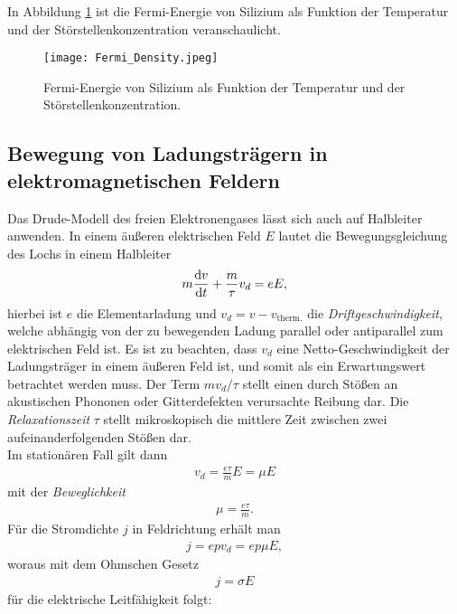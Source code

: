 In Abbildung \ref{fig:fermi_density} ist die Fermi-Energie von Silizium als Funktion der Temperatur und der Störstellenkonzentration veranschaulicht.
\begin{figure}[p]
\centering
\texttt{[image: Fermi\_Density.jpeg]}
\caption{Fermi-Energie von Silizium als Funktion der Temperatur und der Störstellenkonzentration. \cite{lit:Sze07}}
\label{fig:fermi_density}
\end{figure}
\subsection{Bewegung von Ladungsträgern in elektromagnetischen Feldern}
Das Drude-Modell des freien Elektronengases lässt sich auch auf Halbleiter anwenden. In einem äußeren elektrischen Feld $E$ lautet die Bewegungsgleichung des Lochs in einem Halbleiter
\begin{align}
m\frac{\mathrm{d} v}{\mathrm{d} t}+\frac{m}{\tau}v_d=eE,
\end{align}
hierbei ist $e$ die Elementarladung und $v_d=v-v_\text{therm.}$ die \emph{Driftgeschwindigkeit}, welche abhängig von der zu bewegenden Ladung parallel oder antiparallel zum elektrischen Feld ist.
Es ist zu beachten, dass $v_d$ eine Netto-Geschwindigkeit der Ladungsträger in einem äußeren Feld ist, und somit als ein Erwartungswert betrachtet werden muss.
Der Term $mv_d/\tau$ stellt einen durch Stößen an akustischen Phononen oder Gitterdefekten verursachte Reibung dar. Die \emph{Relaxationszeit} $\tau$ stellt mikroskopisch die mittlere Zeit zwischen zwei aufeinanderfolgenden Stößen dar.\\
Im stationären Fall gilt dann
\begin{align}
v_d=\frac{e\tau}{m}E=\mu E
\end{align}
mit der \emph{Beweglichkeit}
\begin{align}
\mu=\frac{e\tau}{m}.
\end{align}
Für die Stromdichte $j$ in Feldrichtung erhält man
\begin{align}
j=epv_d=ep\mu E,
\end{align}
woraus mit dem Ohmschen Gesetz
\begin{align}
j=\sigma E
\end{align}
für die elektrische Leitfähigkeit folgt:
